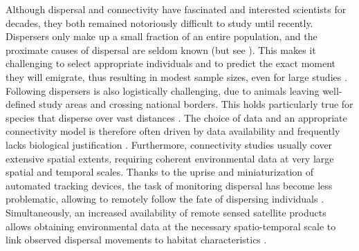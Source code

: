 \documentclass[../FinalThesis.tex]{subfiles}
\begin{document}
Although dispersal and connectivity have fascinated and interested scientists
for decades, they both remained notoriously difficult to study until recently.
Dispersers only make up a small fraction of an entire population, and the
proximate causes of dispersal are seldom known (but see \citealp{Behr.2020}).
This makes it challenging to select appropriate individuals and to predict the
exact moment they will emigrate, thus resulting in modest sample sizes, even for
large studies \citep{Nathan.2001, Rudnick.2012, Fattebert.2015}. Following
dispersers is also logistically challenging, due to animals leaving well-defined
study areas and crossing national borders. This holds particularly true for
species that disperse over vast distances \citep{Osipova.2019, Elliot.2014,
Cozzi.2020}. The choice of data and an appropriate connectivity model is
therefore often driven by data availability \citep{Baguette.2013} and frequently
lacks biological justification \citep{Sawyer.2011, Zeller.2012}. Furthermore,
connectivity studies usually cover extensive spatial extents, requiring coherent
environmental data at very large spatial and temporal scales. Thanks to the
uprise and miniaturization of automated tracking devices, the task of monitoring
dispersal has become less problematic, allowing to remotely follow the fate of
dispersing individuals \citep{Cagnacci.2010, Kays.2015, Jonsson.2016,
Williams.2019, Nathan.2022}. Simultaneously, an increased availability of remote
sensed satellite products allows obtaining environmental data at the necessary
spatio-temporal scale to link observed dispersal movements to habitat
characteristics \citep{Toth.2016, Rumiano.2020}.
\end{document}
